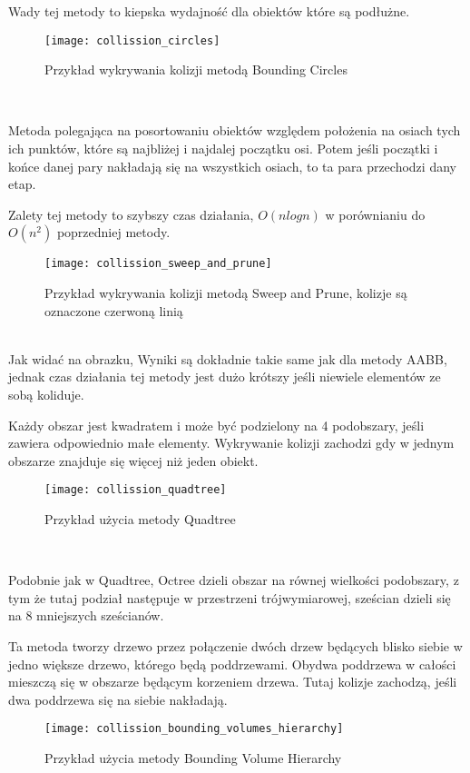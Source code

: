 Wady tej metody to kiepska wydajno\'sć dla obiektów które są podłużne.
\begin{figure}[h]
	\centering
	\noindent\texttt{[image: collission\_circles]}
	\caption{Przykład wykrywania kolizji metodą Bounding Circles}
\end{figure}\\
\newpage

\smallskip

Metoda polegająca na posortowaniu obiektów względem położenia na osiach tych ich punktów, które są najbliżej i najdalej początku osi. Potem je\'sli początki i końce danej pary nakładają się na wszystkich osiach, to ta para przechodzi dany etap.

Zalety tej metody to szybszy czas działania, $O(nlogn)$ w porównianiu do $O(n^{2})$ poprzedniej metody.
\begin{figure}[h]
	\centering
	\noindent\texttt{[image: collission\_sweep\_and\_prune]}
	\caption{Przykład wykrywania kolizji metodą Sweep and Prune, kolizje są oznaczone czerwoną linią}
\end{figure}\\
Jak widać na obrazku, Wyniki są dokładnie takie same jak dla metody AABB, jednak czas działania tej metody jest dużo krótszy je\'sli niewiele elementów ze sobą koliduje.
\newpage

\smallskip

Każdy obszar jest kwadratem i może być podzielony na 4 podobszary, je\'sli zawiera odpowiednio małe elementy. Wykrywanie kolizji zachodzi gdy w jednym obszarze znajduje się więcej niż jeden obiekt.\\
\begin{figure}[h]
	\centering
	\noindent\texttt{[image: collission\_quadtree]}
	\caption{Przykład użycia metody Quadtree}
\end{figure}\\

\smallskip

Podobnie jak w Quadtree, Octree dzieli obszar na równej wielko\'sci podobszary, z tym że tutaj podział następuje w przestrzeni trójwymiarowej, sze\'scian dzieli się na 8 mniejszych sze\'scianów.\\
\newpage
 
\smallskip

Ta metoda tworzy drzewo przez połączenie dwóch drzew będących blisko siebie w jedno większe drzewo, którego będą poddrzewami. Obydwa poddrzewa w cało\'sci mieszczą się w obszarze będącym korzeniem drzewa. Tutaj kolizje zachodzą, je\'sli dwa poddrzewa się na siebie nakładają.\\
\begin{figure}[h]
	\centering
	\noindent\texttt{[image: collission\_bounding\_volumes\_hierarchy]}
	\caption{Przykład użycia metody Bounding Volume Hierarchy}
\end{figure}\\
\newpage


